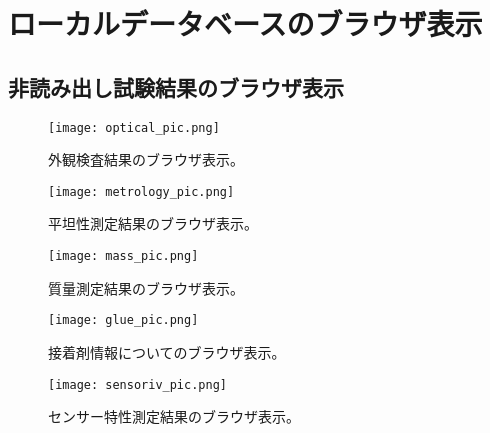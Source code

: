 \chapter{ローカルデータベースのブラウザ表示}
\label{sec:A}

\section{非読み出し試験結果のブラウザ表示}
\label{sec:A1}

\begin{figure}[h]
	\centering
	\texttt{[image: optical\_pic.png]}
	\caption[外観検査結果のブラウザ表示]{外観検査結果のブラウザ表示。}
	\label{fig:optical_pic}
\end{figure}

\begin{figure}[h]
	\centering
	\texttt{[image: metrology\_pic.png]}
	\caption[平坦性測定結果のブラウザ表示]{平坦性測定結果のブラウザ表示。}
	\label{fig:metrology_pic}
\end{figure}


\begin{figure}[h]
	\centering
	\texttt{[image: mass\_pic.png]}
	\caption[質量測定結果のブラウザ表示]{質量測定結果のブラウザ表示。}
	\label{fig:mass_pic}
\end{figure}

\begin{figure}[h]
	\centering
	\texttt{[image: glue\_pic.png]}
	\caption[接着剤情報についてのブラウザ表示]{接着剤情報についてのブラウザ表示。}
	\label{fig:glue_pic}
\end{figure}

\begin{figure}[h]
	\centering
	\texttt{[image: sensoriv\_pic.png]}
	\caption[センサー特性測定結果のブラウザ表示]{センサー特性測定結果のブラウザ表示。}
	\label{fig:sensoriv_pic}
\end{figure}

